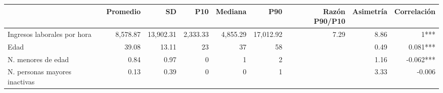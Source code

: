 \begingroup
\fontsize{12.0pt}{14.4pt}\selectfont
\begin{longtable}{lrrrrrrrr}
\toprule
  & Promedio & SD & P10 & Mediana & P90 & Razón P90/P10 & Asimetría & Correlación \\ 
\midrule\addlinespace[2.5pt]
Ingresos laborales por hora & 8,578.87 & 13,902.31 & 2,333.33 & 4,855.29 & 17,012.92 & 7.29 & 8.86 & 1*** \\ 
Edad & 39.08 & 13.11 & 23 & 37 & 58 &   & 0.49 & 0.081*** \\ 
N. menores de edad & 0.84 & 0.97 & 0 & 1 & 2 &   & 1.16 & -0.062*** \\ 
N. personas mayores inactivas & 0.13 & 0.39 & 0 & 0 & 1 &   & 3.33 & -0.006 \\ 
\bottomrule
\end{longtable}
\endgroup

